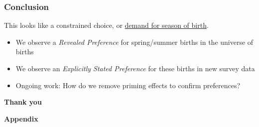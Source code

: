 \documentclass[10pt,letterpaper,subeqn]{beamer}
\begin{document}

\begin{frame}[label=conclusions2]
\frametitle{Conclusion}
This looks like a constrained choice, or \underline{demand for season of birth}.
\vspace{3mm} \\
\begin{itemize}
\item We observe a \emph{Revealed Preference} for spring/summer births in the universe of births
\item We observe an \emph{Explicitly Stated Preference} for these births in new survey data
\item Ongoing work: How do we remove priming effects to confirm preferences?
\end{itemize}
\end{frame}


\begin{frame}
  \begin{center}
    \textbf{Thank you}
  \end{center}
\end{frame}


\begin{frame}
\begin{center}
    \textbf{Appendix}
\end{center}
\end{frame}
\end{document}
